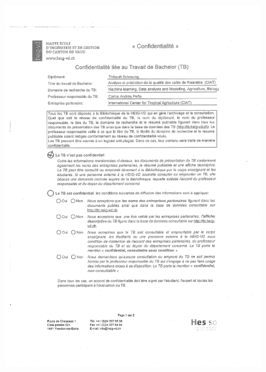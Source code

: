 \documentclass[11pt,a4paper,twoside,openright]{report}
\begin{document}
	\begin{figure}[h]
		\centering
		\includegraphics[page= 2, width=0.8\linewidth]{doc/NDA_TB_Schowing_Signed}
		\label{fig:ndatbschowingsigned2}
	\end{figure}
	
	
	{}
	
	\nocite{*}
	
	\listoffigures
	
	\listoftables
	
	\printnomenclature
	
	
	
\end{document}
